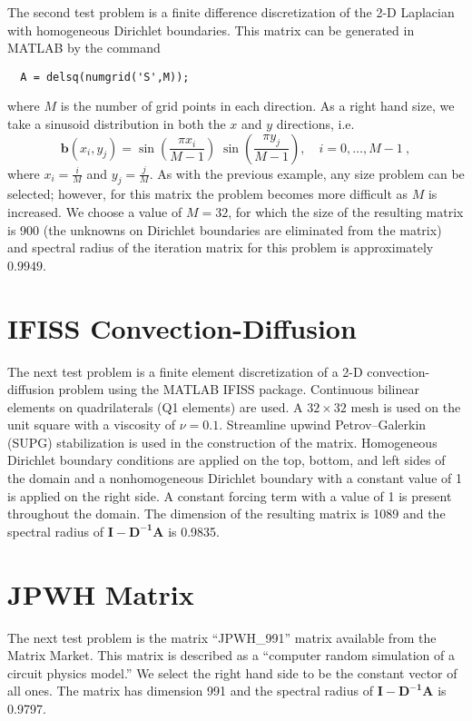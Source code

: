 \documentclass{article}
\begin{document}
The second test problem is a finite difference discretization of the 2-D
Laplacian with homogeneous Dirichlet boundaries.  This matrix can be
generated in MATLAB by the command
\begin{verbatim}
  A = delsq(numgrid('S',M));
\end{verbatim}
where $M$ is the number of grid points in each direction.
As a right hand size, we take a sinusoid distribution in both the
$x$ and $y$ directions, i.e.
\begin{equation}
 \mathbf{b}(x_i,y_j) = \sin \left( \frac{\pi x_i}{M-1} \right) \;
                       \sin \left( \frac{\pi y_j}{M-1} \right), \quad i=0,\ldots,M-1 \:,
\end{equation}
where $x_i=\frac{i}{M}$ and $y_j=\frac{j}{M}$.  As with the previous example,
any size problem can be selected; however, for this matrix the problem becomes
more difficult as $M$ is increased.  We choose a value of $M=32$, for which
the size of the resulting matrix is 900 (the unknowns on Dirichlet boundaries
are eliminated from the matrix) and spectral radius of the iteration
matrix for this problem is approximately $0.9949$.

\section{IFISS Convection-Diffusion}

The next test problem is a finite element discretization of a 
2-D convection-diffusion problem using the MATLAB IFISS package.
Continuous bilinear elements on quadrilaterals (Q1 elements) are used.
A $32 \times 32$ mesh is used on the unit square with a viscosity of
$\nu=0.1$.  Streamline upwind Petrov--Galerkin (SUPG) stabilization
is used in the construction of the matrix.  Homogeneous Dirichlet
boundary conditions are applied on the top, bottom, and left sides of
the domain and a nonhomogeneous Dirichlet boundary with a constant value
of 1 is applied on the right side.  A constant forcing term with a value
of 1 is present throughout the domain.  The dimension of the resulting
matrix is 1089 and the spectral radius of $\mathbf{I - D^{-1}A}$
is 0.9835.

\section{JPWH Matrix}

The next test problem is the matrix ``JPWH\_991'' matrix available from
the Matrix Market.  This matrix
is described as a ``computer random simulation of a circuit physics model.''
We select the right hand side to be the constant vector of all ones.  The
matrix has dimension 991 and the
spectral radius of $\mathbf{I - D^{-1}A}$ is 0.9797.
\end{document}
